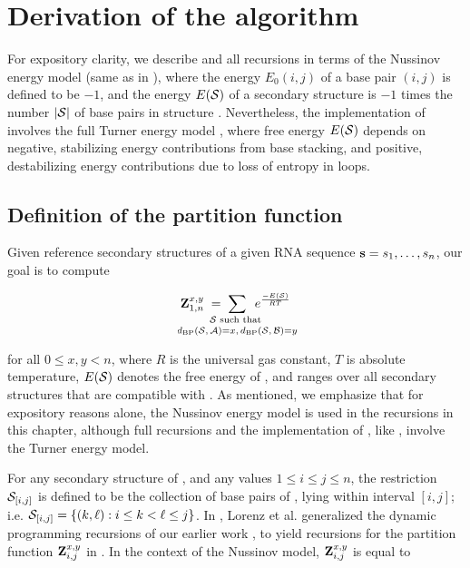 \section{Derivation of the \ffttwo algorithm}
\label{sec:ffttwo:math}

For expository clarity, we describe \ffttwo \citep{senter.jmb14}
and all recursions
in terms of the Nussinov energy model \citep{nussinovjacobson}
(same as in ), where
the energy $E_0(i,j)$ of a base pair $(i,j)$ is defined to be $-1$, and the
energy $E(\mathcal S)$ of a secondary structure \str is $-1$ times the number $|\mathcal S|$
of base pairs in structure \str.  Nevertheless, the implementation of
\ffttwo involves the full Turner energy model \citep{xia:RNA}, where
free energy $E(\mathcal S)$ depends on negative, stabilizing energy contributions
from base stacking, and positive, destabilizing energy contributions due to
loss of entropy in loops.

\subsection{Definition of the partition function
\texorpdfstring{}{}}
\label{subsec:ffttwo:recursions}

Given reference secondary structures \strAB of a
given RNA sequence ${\bf s}=s_1,\dots,s_n$, our goal is to compute

\begin{align}
\label{eq:ffttwo:sumBoltzFactors}
\bfZ{x,y}{1,n}\;=\;
\sum_{\mathclap{\substack{
\str \text{ such that } \rule[-.5ex]{0pt}{0pt} \\
\dBP{\str}{\strA} = x,\,\dBP{\str}{\strB} = y}}}\enspace
\boltzF{\str}
\end{align}

for all $0 \leq x,y < n$, where $R$ is the universal gas constant, $T$
is absolute temperature, $E(\mathcal S)$ denotes the free energy of \str,
and \str ranges
over all secondary structures that are compatible with \seq. As mentioned,
we emphasize that for expository reasons alone, the Nussinov energy model is
used in the recursions in this chapter, although full recursions and
the implementation of \ffttwo, like \fftbor, involve the Turner energy model.

For any secondary structure \str of \seq, and any values
$1 \leq i \leq j \leq n$, the restriction $\mathcal S_{[i,j]}$ is defined to be the
collection of base pairs of \str, lying within interval $[i,j]$; i.e.
$\mathcal S_{[i,j]} = \{ (k, \ell) : i \leq k < \ell \leq j \}$.
In \citep{hofacker:RNAbor2D}, Lorenz et al. generalized
the dynamic programming recursions of our earlier work \citep{freyhult.b07},
to yield recursions
for the partition function ${\bf Z}^{x,y}_{i,j}$ in
. In the context of the Nussinov model,
${\bf Z}^{x,y}_{i,j}$ is equal to

